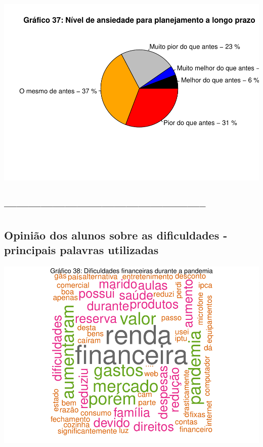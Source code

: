 \documentclass[
]{article}
\begin{document}
\includegraphics{consequencias-oriundas-da-pandemia-v1.0_files/figure-latex/grafico-cuca-1.pdf}

\hypertarget{section-2}{%
\subsection{--------------------------------------------------}\label{section-2}}

\hypertarget{opiniuxe3o-dos-alunos-sobre-as-dificuldades---principais-palavras-utilizadas}{%
\subsection{Opinião dos alunos sobre as dificuldades - principais
palavras
utilizadas}\label{opiniuxe3o-dos-alunos-sobre-as-dificuldades---principais-palavras-utilizadas}}

\includegraphics{consequencias-oriundas-da-pandemia-v1.0_files/figure-latex/grafico-38-1.pdf}
\end{document}
